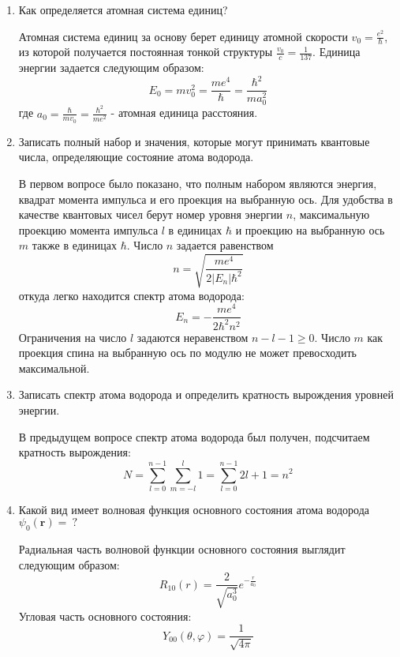 \documentclass{article}
\begin{document}
\begin{enumerate}
		 \item {Как определяется атомная система единиц?}
		 
		 Атомная система единиц за основу берет единицу атомной скорости $v_0 = \frac{e^2}{\hbar}$, из которой получается постоянная тонкой структуры $\frac{v_0}{c} = \frac{1}{137}$. Единица энергии задается следующим образом:
		 \begin{equation}
		 	E_0 = mv_0^2 = \frac{me^4}{\hbar} = \frac{\hbar^2}{ma_0^2}
		 \end{equation}
		 где $a_0 = \frac{\hbar}{mv_0} = \frac{\hbar^2}{me^2}$ - атомная единица расстояния.
		 
		 \item {Записать полный набор и значения, которые могут принимать квантовые числа, определяющие состояние атома водорода.}
		 
		 В первом вопросе было показано, что полным набором являются энергия, квадрат момента импульса и его проекция на выбранную ось. Для удобства в качестве квантовых чисел берут номер уровня энергии $n$, максимальную проекцию момента импульса $l$ в единицах $\hbar$ и проекцию на выбранную ось $m$ также в единицах $\hbar$. Число $n$ задается равенством
		 \begin{equation}
		 	n = \sqrt{\frac{me^4}{2|E_n|\hbar^2}}
		 \end{equation}
		 откуда легко находится спектр атома водорода:
		 \begin{equation}
		 	E_n = -\frac{me^4}{2\hbar^2 n^2}
		 \end{equation}
		 Ограничения на число $l$ задаются неравенством $n - l - 1 \geq 0$. Число $m$ как проекция спина на выбранную ось по модулю не может превосходить максимальной.
		 \item {Записать спектр атома водорода и определить кратность вырождения уровней энергии.}
		 
		 В предыдущем вопросе спектр атома водорода был получен, подсчитаем кратность вырождения:
		 \begin{equation}
		 	N = \sum\limits_{l=0}^{n-1}\sum\limits_{m=-l}^{l}1 = \sum\limits_{l=0}^{n-1} 2l+1 = n^2
		 \end{equation}
		 
		 \item {Какой вид имеет волновая функция основного состояния атома водорода $\psi_0(\textbf{r}) = \ ?$}
		 
		 Радиальная часть волновой функции основного состояния выглядит следующим образом:
		 \begin{equation}
		 	R_{10}(r) = \frac{2}{\sqrt{a_0^3}}e^{-\frac{r}{a_0}}
		 \end{equation}
		 Угловая часть основного состояния:
		 \begin{equation}
		 	Y_{00}(\theta, \varphi) = \frac{1}{\sqrt{4\pi}}
		 \end{equation}
	\end{enumerate}
\end{document}
